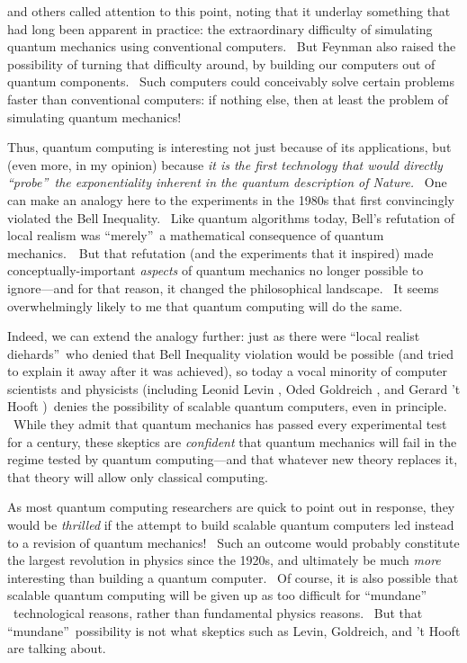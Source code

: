\documentclass[11pt,onecolumn]{article}%
\begin{document}
\cite{feynman:qc} and others called attention to this point, noting that it
underlay something that had long been apparent in practice: the extraordinary
difficulty of simulating quantum mechanics using conventional computers. \ But
Feynman also raised the possibility of turning that difficulty around, by
building our computers out of quantum components. \ Such computers could
conceivably solve certain problems faster than conventional computers: if
nothing else, then at least the problem of simulating quantum mechanics!

Thus, quantum computing is interesting not just because of its applications,
but (even more, in my opinion) because \textit{it is the first technology that
would directly \textquotedblleft probe\textquotedblright\ the exponentiality
inherent in the quantum description of Nature.} \ One can make an analogy here
to the experiments in the 1980s that first convincingly violated the Bell
Inequality. \ Like quantum algorithms today, Bell's refutation of local
realism was \textquotedblleft merely\textquotedblright\ a mathematical
consequence of quantum mechanics.\ \ But that refutation (and the experiments
that it inspired) made conceptually-important \textit{aspects} of quantum
mechanics no longer possible to ignore---and for that reason, it changed the
philosophical landscape. \ It seems overwhelmingly likely to me that quantum
computing will do the same.

Indeed, we can extend the analogy further: just as there were
\textquotedblleft local realist diehards\textquotedblright\ who denied that
Bell Inequality violation would be possible (and tried to explain it away
after it was achieved), so today a vocal minority of computer scientists and
physicists (including Leonid Levin \cite{levin:qc}, Oded Goldreich
\cite{goldreich:qc}, and Gerard 't Hooft \cite{thooft})\ denies the
possibility of scalable quantum computers, even in principle. \ While they
admit that quantum mechanics has passed every experimental test for a century,
these skeptics are \textit{confident} that quantum mechanics will fail in the
regime tested by quantum computing---and that whatever new theory replaces it,
that theory will allow only classical computing.

As most quantum computing researchers are quick to point out in response, they
would be \textit{thrilled} if the attempt to build scalable quantum computers
led instead to a revision of quantum mechanics! \ Such an outcome would
probably constitute the largest revolution in physics since the 1920s, and
ultimately be much \textit{more} interesting than building a quantum computer.
\ Of course, it is also possible that scalable quantum computing will be given
up as too difficult for \textquotedblleft mundane\textquotedblright%
\ technological reasons, rather than fundamental physics reasons. \ But that
\textquotedblleft mundane\textquotedblright\ possibility is not what skeptics
such as Levin, Goldreich, and 't Hooft are talking about.
\end{document}
